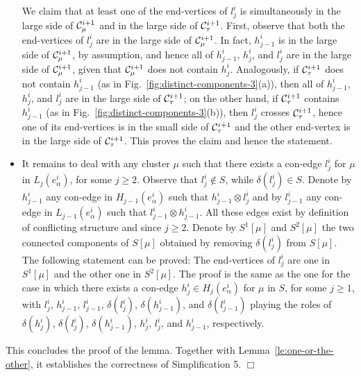 \documentclass[letter,runningheads]{llncs}
\renewenvironment{proof}
{{\em Proof.\ }}{\hspace*{\fill}$\Box$\par\vspace{2mm}}
\newcommand{\conf}{\otimes}
\begin{document}
\begin{proof}
\begin{itemize}
We claim that at least one of the end-vertices of $l^i_j$ is simultaneously in the large side of  ${\cal C}^{i+1}_{\mu}$ and in the large side of  ${\cal C}^{i+1}_{\tau}$. First, observe that both the end-vertices of $l^i_j$ are in the large side of ${\cal C}^{i+1}_{\mu}$. In fact, $h^i_{j-1}$ is in the large side of ${\cal C}^{i+1}_{\mu}$, by assumption, and hence all of $h^i_{j-1}$, $h^i_{j}$, and $l^i_{j}$ are in the large side of ${\cal C}^{i+1}_{\mu}$, given that ${\cal C}^{i+1}_{\mu}$ does not contain $h^i_j$. Analogously, if ${\cal C}^{i+1}_{\tau}$ does not contain $h^i_{j-1}$ (as in Fig.~\ref{fig:distinct-components-3}(a)), then all of $h^i_{j-1}$, $h^i_{j}$, and $l^i_{j}$ are in the large side of ${\cal C}^{i+1}_{\tau}$; on the other hand, if ${\cal C}^{i+1}_{\tau}$ contains $h^i_{j-1}$ (as in Fig.~\ref{fig:distinct-components-3}(b)), then $l^i_{j}$ crosses ${\cal C}^{i+1}_{\tau}$, hence one of its end-vertices is in the small side of ${\cal C}^{i+1}_{\tau}$ and the other end-vertex is in the large side of ${\cal C}^{i+1}_{\tau}$. This proves the claim and hence the statement.


\item It remains to deal with any cluster $\mu$ such that there exists a con-edge $l^i_j$ for $\mu$ in $L_j(e^i_{\alpha})$, for some $j\geq 2$. Observe that $l^i_j\notin S$, while $\delta(l^i_j)\in S$. Denote by $h^i_{j-1}$ any con-edge in $H_{j-1}(e^i_{\alpha})$ such that $h^i_{j-1} \conf l^i_{j}$ and by $l^i_{j-1}$ any con-edge in $L_{j-1}(e^i_{\alpha})$ such that $l^i_{j-1} \conf h^i_{j-1}$. All these edges exist by definition of conflicting structure and since $j\geq 2$. Denote by $S^1[\mu]$ and $S^2[\mu]$ the two connected components of $S[\mu]$ obtained by removing $\delta(l^i_j)$ from $S[\mu]$. The following statement can be proved: The end-vertices of $l^i_j$ are one in $S^1[\mu]$ and the other one in $S^2[\mu]$. The proof is the same as the one for the case in which there exists a con-edge $h^i_j\in H_j(e^i_{\alpha})$ for $\mu$ in $S$, for some $j\geq 1$, with $l^i_j$, $h^i_{j-1}$, $l^i_{j-1}$, $\delta(l^i_j)$, $\delta(h^i_{j-1})$, and $\delta(l^i_{j-1})$ playing the roles of $\delta(h^i_{j})$, $\delta(l^i_j)$, $\delta(h^i_{j-1})$, $h^i_{j}$, $l^i_j$, and $h^i_{j-1}$, respectively.
\end{itemize}

This concludes the proof of the lemma. Together with Lemma~\ref{le:one-or-the-other}, it establishes the correctness of {\sc Simplification 5}.
\end{proof}
\end{document}
